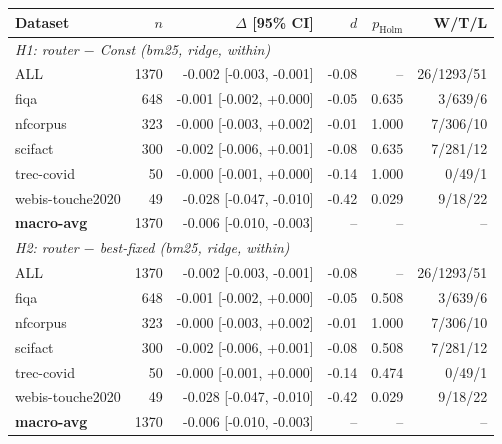 \begin{tabular}{lrrrrr}
\hline
Dataset & $n$ & $\Delta$ [95\% CI] & $d$ & $p_{\mathrm{Holm}}$ & W/T/L \\
\hline
\multicolumn{6}{l}{\textit{H1: router $-$ Const (bm25, ridge, within)}} \\
ALL & 1370 & -0.002 [-0.003, -0.001] & -0.08 & -- & 26/1293/51 \\
fiqa & 648 & -0.001 [-0.002, +0.000] & -0.05 & 0.635 & 3/639/6 \\
nfcorpus & 323 & -0.000 [-0.003, +0.002] & -0.01 & 1.000 & 7/306/10 \\
scifact & 300 & -0.002 [-0.006, +0.001] & -0.08 & 0.635 & 7/281/12 \\
trec-covid & 50 & -0.000 [-0.001, +0.000] & -0.14 & 1.000 & 0/49/1 \\
webis-touche2020 & 49 & -0.028 [-0.047, -0.010] & -0.42 & 0.029 & 9/18/22 \\
\textbf{macro-avg} & 1370 & -0.006 [-0.010, -0.003] & -- & -- & -- \\
\hline
\multicolumn{6}{l}{\textit{H2: router $-$ best-fixed (bm25, ridge, within)}} \\
ALL & 1370 & -0.002 [-0.003, -0.001] & -0.08 & -- & 26/1293/51 \\
fiqa & 648 & -0.001 [-0.002, +0.000] & -0.05 & 0.508 & 3/639/6 \\
nfcorpus & 323 & -0.000 [-0.003, +0.002] & -0.01 & 1.000 & 7/306/10 \\
scifact & 300 & -0.002 [-0.006, +0.001] & -0.08 & 0.508 & 7/281/12 \\
trec-covid & 50 & -0.000 [-0.001, +0.000] & -0.14 & 0.474 & 0/49/1 \\
webis-touche2020 & 49 & -0.028 [-0.047, -0.010] & -0.42 & 0.029 & 9/18/22 \\
\textbf{macro-avg} & 1370 & -0.006 [-0.010, -0.003] & -- & -- & -- \\
\hline
\end{tabular}